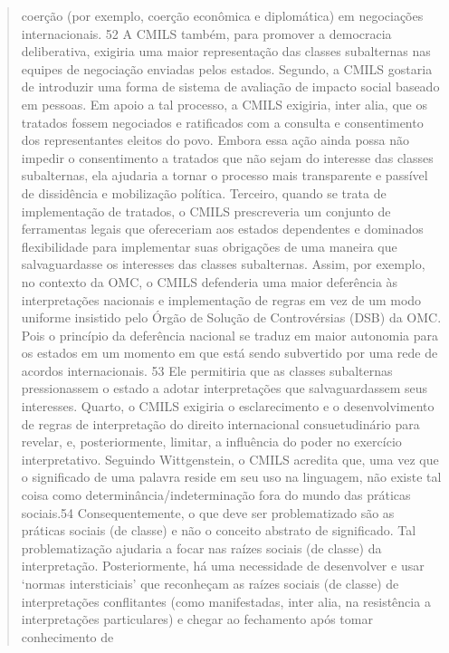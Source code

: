 \documentclass{article}
\begin{document}
\begin{quote}
coerção (por exemplo, coerção econômica e diplomática) em negociações internacionais. 52 A CMILS também, para promover a democracia deliberativa, exigiria uma maior representação das classes subalternas nas equipes de negociação enviadas pelos estados.
Segundo, a CMILS gostaria de introduzir uma forma de sistema de avaliação de impacto social
baseado em pessoas. Em apoio a tal processo, a CMILS exigiria,
inter alia, que os tratados fossem negociados e ratificados com a consulta e consentimento dos representantes eleitos do povo. Embora essa
ação ainda possa não impedir o consentimento a tratados que não sejam do interesse
das classes subalternas, ela ajudaria a tornar o processo mais transparente
e passível de dissidência e mobilização política.
Terceiro, quando se trata de implementação de tratados, o CMILS prescreveria um conjunto de ferramentas legais que ofereceriam aos estados dependentes e dominados
flexibilidade para implementar suas obrigações de uma maneira que salvaguardasse os
interesses das classes subalternas. Assim, por exemplo, no contexto da
OMC, o CMILS defenderia uma maior deferência às interpretações nacionais e implementação de regras em vez de um modo uniforme insistido
pelo Órgão de Solução de Controvérsias (DSB) da OMC. Pois o princípio da deferência nacional se traduz em maior autonomia para os estados em um momento em que
está sendo subvertido por uma rede de acordos internacionais. 53 Ele
permitiria que as classes subalternas pressionassem o estado a adotar
interpretações que salvaguardassem seus interesses.
Quarto, o CMILS exigiria o esclarecimento e o desenvolvimento de
regras de interpretação do direito internacional consuetudinário para revelar,
e, posteriormente, limitar, a influência do poder no exercício interpretativo. Seguindo Wittgenstein, o CMILS acredita que, uma vez que o significado de
uma palavra reside em seu uso na linguagem, não existe tal coisa como determinância/indeterminação fora do mundo das práticas sociais.54 Consequentemente,
o que deve ser problematizado são as práticas sociais (de classe) e não o
conceito abstrato de significado. Tal problematização ajudaria a focar
nas raízes sociais (de classe) da interpretação. Posteriormente, há uma necessidade de
desenvolver e usar ‘normas intersticiais’ que reconheçam as raízes sociais (de classe)
de interpretações conflitantes (como manifestadas, inter alia, na resistência a
interpretações particulares) e chegar ao fechamento após tomar conhecimento de


\end{quote}
\end{document}

